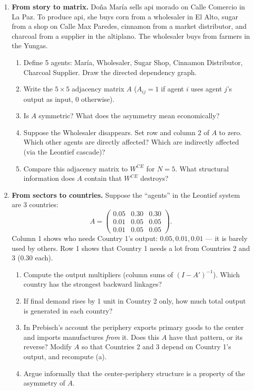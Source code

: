 \documentclass[../structural_economics_book.tex]{subfiles}
\begin{document}
\begin{enumerate}[label=\textbf{1.\arabic*}, leftmargin=3em]
\item \textbf{From story to matrix.} Do\~{n}a Mar\'{i}a sells api morado on Calle Comercio in La Paz. To produce api, she buys corn from a wholesaler in El Alto, sugar from a shop on Calle Max Paredes, cinnamon from a market distributor, and charcoal from a supplier in the altiplano. The wholesaler buys from farmers in the Yungas.
\begin{enumerate}
\item Define 5 agents: Mar\'{i}a, Wholesaler, Sugar Shop, Cinnamon Distributor, Charcoal Supplier. Draw the directed dependency graph.
\item Write the $5 \times 5$ adjacency matrix $A$ ($A_{ij} = 1$ if agent $i$ uses agent $j$'s output as input, 0 otherwise).
\item Is $A$ symmetric? What does the asymmetry mean economically?
\item Suppose the Wholesaler disappears. Set row and column 2 of $A$ to zero. Which other agents are directly affected? Which are indirectly affected (via the Leontief cascade)?
\item Compare this adjacency matrix to $W^{CE}$ for $N = 5$. What structural information does $A$ contain that $W^{CE}$ destroys?
\end{enumerate}

\item \textbf{From sectors to countries.} Suppose the ``agents'' in the Leontief system are 3 countries:
\begin{equation}
A = \begin{pmatrix} 0.05 & 0.30 & 0.30 \\ 0.01 & 0.05 & 0.05 \\ 0.01 & 0.05 & 0.05 \end{pmatrix}.
\end{equation}
Column 1 shows who needs Country 1's output: $0.05, 0.01, 0.01$ --- it is barely used by others. Row 1 shows that Country 1 needs a lot from Countries 2 and 3 ($0.30$ each).
\begin{enumerate}
\item Compute the output multipliers (column sums of $(I - A')^{-1}$). Which country has the strongest backward linkages?
\item If final demand rises by 1 unit in Country 2 only, how much total output is generated in each country?
\item In Prebisch's account the periphery exports primary goods to the center and imports manufactures \textit{from} it. Does this $A$ have that pattern, or its reverse? Modify $A$ so that Countries 2 and 3 depend on Country 1's output, and recompute (a).
\item Argue informally that the center-periphery structure is a property of the asymmetry of $A$.
\end{enumerate}
\end{enumerate}
\end{document}
